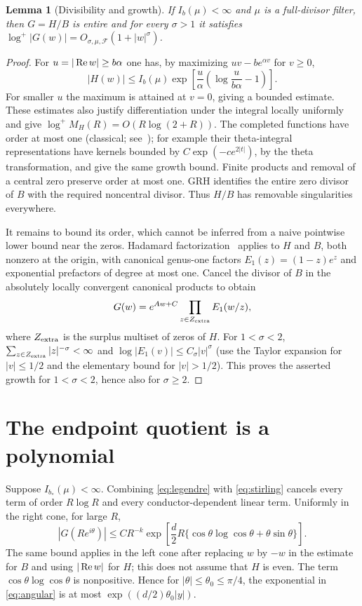 \documentclass[11pt]{article}
\newtheorem{lemma}[theorem]{Lemma}
\theoremstyle{remark}\newtheorem{remark}[theorem]{Remark}
\newcommand{\F}{\mathcal F}\newcommand{\dd}{\,\mathrm d}
\begin{document}
\begin{lemma}[Divisibility and growth]\label{lem:division}
If $I_b(\mu)<\infty$ and $\mu$ is a full-divisor filter, then $G=H/B$ is entire and for every $\sigma>1$ it satisfies $\log^+|G(w)|=O_{\sigma,\mu,\F}(1+|w|^\sigma)$.
\end{lemma}
\begin{proof}
For $u=|\operatorname{Re} w|\ge b\alpha$ one has, by maximizing $uv-be^{\alpha v}$ for $v\ge0$,
\begin{equation}\label{eq:legendre}
 |H(w)|\le I_b(\mu)\exp\left[\frac u\alpha\left(\log\frac{u}{b\alpha}-1\right)\right].
\end{equation}
For smaller $u$ the maximum is attained at $v=0$, giving a bounded estimate. These estimates also justify differentiation under the integral locally uniformly and give $\log^+ M_H(R)=O(R\log(2+R))$. The completed functions have order at most one (classical; see~\cite{davenport,titchmarsh}); for example their theta-integral representations have kernels bounded by $C\exp(-c e^{2|t|})$, by the theta transformation, and give the same growth bound. Finite products and removal of a central zero preserve order at most one. GRH identifies the entire zero divisor of $B$ with the required noncentral divisor. Thus $H/B$ has removable singularities everywhere.

It remains to bound its order, which cannot be inferred from a naive pointwise lower bound near the zeros. Hadamard factorization~\cite{boas} applies to $H$ and $B$, both nonzero at the origin, with canonical genus-one factors $E_1(z)=(1-z)e^z$ and exponential prefactors of degree at most one. Cancel the divisor of $B$ in the absolutely locally convergent canonical products to obtain
\[
 G(w)=e^{Aw+C}\prod_{z\in Z_{\rm extra}} E_1(w/z),
\]
where $Z_{\rm extra}$ is the surplus multiset of zeros of $H$. For $1<\sigma<2$, $\sum_{z\in Z_{\rm extra}}|z|^{-\sigma}<\infty$ and $\log |E_1(v)|\le C_\sigma|v|^\sigma$ (use the Taylor expansion for $|v|\le1/2$ and the elementary bound for $|v|>1/2$). This proves the asserted growth for $1<\sigma<2$, hence also for $\sigma\ge2$.
\end{proof}

\section{The endpoint quotient is a polynomial}\label{sec:rigidity}
Suppose $I_{b_*}(\mu)<\infty$. Combining \eqref{eq:legendre} with \eqref{eq:stirling} cancels every term of order $R\log R$ and every conductor-dependent linear term. Uniformly in the right cone, for large $R$,
\begin{equation}\label{eq:angular}
 |G(R e^{i\theta})|\le C R^{-k}
 \exp\left[\frac d2 R\{\cos\theta\log\cos\theta+\theta\sin\theta\}\right].
\end{equation}
The same bound applies in the left cone after replacing $w$ by $-w$ in the estimate for $B$ and using $|\operatorname{Re} w|$ for $H$; this does not assume that $H$ is even. The term $\cos\theta\log\cos\theta$ is nonpositive. Hence for $|\theta|\le\theta_0\le\pi/4$, the exponential in \eqref{eq:angular} is at most $\exp((d/2)\theta_0|y|)$.
\end{document}
